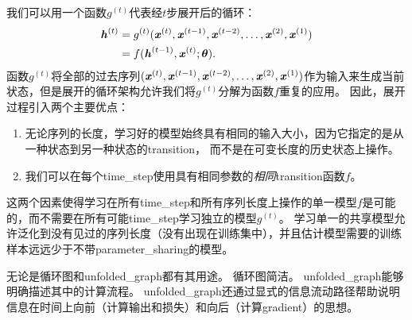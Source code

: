 我们可以用一个函数$g^{(t)}$代表经$t$步展开后的循环：
\begin{align}
  \boldsymbol{\mathit{h}}^{(t)} &=g^{(t)}(\boldsymbol{\mathit{x}}^{(t)},\boldsymbol{\mathit{x}}^{(t-1)}, \boldsymbol{\mathit{x}}^{(t-2)},\dots,\boldsymbol{\mathit{x}}^{(2)}, \boldsymbol{\mathit{x}}^{(1)}) \\
  & =  f(\boldsymbol{\mathit{h}}^{(t-1)}, \boldsymbol{\mathit{x}}^{(t)} ; \boldsymbol{\theta}) .
\end{align}
函数$g^{(t)}$将全部的过去序列$(\boldsymbol{\mathit{x}}^{(t)},\boldsymbol{\mathit{x}}^{(t-1)}, \boldsymbol{\mathit{x}}^{(t-2)},\dots,\boldsymbol{\mathit{x}}^{(2)}, \boldsymbol{\mathit{x}}^{(1)})$作为输入来生成当前状态，但是展开的循环架构允许我们将$g^{(t)}$分解为函数$f$重复的应用。
因此，展开过程引入两个主要优点：
\begin{enumerate}
 \item 无论序列的长度，学习好的模型始终具有相同的输入大小，因为它指定的是从一种状态到另一种状态的\gls{transition}， 而不是在可变长度的历史状态上操作。
 \item 我们可以在每个\gls{time_step}使用具有相同参数的\emph{相同}\gls{transition}函数$f$。
\end{enumerate}
这两个因素使得学习在所有\gls{time_step}和所有序列长度上操作的单一模型$f$是可能的，而不需要在所有可能\gls{time_step}学习独立的模型$g^{(t)}$。
学习单一的共享模型允许泛化到没有见过的序列长度（没有出现在训练集中），并且估计模型需要的训练样本远远少于不带\gls{parameter_sharing}的模型。


无论是循环图和\gls{unfolded_graph}都有其用途。
循环图简洁。
\gls{unfolded_graph}能够明确描述其中的计算流程。
\gls{unfolded_graph}还通过显式的信息流动路径帮助说明信息在时间上向前（计算输出和损失）和向后（计算\gls{gradient}）的思想。



